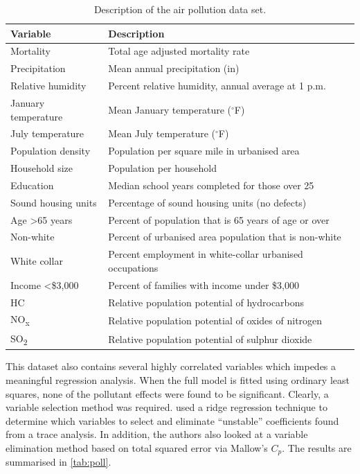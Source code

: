 \documentclass[showframe,11pt,twoside,openright]{report}
\begin{document}
\begin{table}[hbt]
\centering
\caption{Description of the air pollution data set.}
\label{tab:airpollution}
\begin{tabular}{ll}
\toprule
Variable                 & Description \\
\midrule
Mortality                & Total age adjusted mortality rate \\
Precipitation            & Mean annual precipitation (in) \\
Relative humidity        & Percent relative humidity, annual average at 1 p.m. \\
January temperature      & Mean January temperature ($^\circ$F) \\
July temperature         & Mean July temperature ($^\circ$F) \\
Population density       & Population per square mile in urbanised area \\
Household size & Population per household  \\
Education                & Median school years completed for those over 25 \\
Sound housing units      & Percentage of sound housing units (no defects) \\
Age >65 years            & Percent of population that is 65 years of age or over \\
Non-white                & Percent of urbanised area population that is non-white \\
White collar             & Percent employment in white-collar urbanised occupations \\
Income <\$3,000          & Percent of families with income under \$3,000 \\      
HC                       & Relative population potential of hydrocarbons \\     
NO\textsubscript{x}      & Relative population potential of oxides of nitrogen \\
SO\textsubscript{2}      & Relative population potential of sulphur dioxide \\       
\end{tabular}
\end{table}

This dataset also contains several highly correlated variables which impedes a meaningful regression analysis. 
When the full model is fitted using ordinary least squares, none of the pollutant effects were found to be significant. 
Clearly, a variable selection method was required. 
\citet{McDonald1973} used a ridge regression technique to determine which variables to select and eliminate ``unstable'' coefficients found from a trace analysis. 
In addition, the authors also looked at a variable elimination method based on total squared error via Mallow's $C_p$.
The results are summarised in \cref{tab:poll}.
\end{document}
